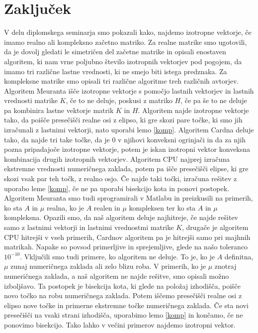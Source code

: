 \documentclass[12pt,a4paper]{amsart}
\theoremstyle{definition}
\theoremstyle{plain}
\begin{document}
\section{Zaključek}
V delu diplomskega seminarja smo pokazali kako, najdemo izotropne vektorje, če imamo realno ali kompleksno začetno matriko. 
Za realne matrike smo ugotovili, da je dovolj gledati le simetričen del začetne matrike in opisali enostaven algoritem, ki nam vrne poljubno število izotropnih vektorjev pod pogojem, da imamo tri različne lastne vrednosti, ki ne smejo biti istega predznaka. 
Za kompleksne matrike smo opisali tri različne algoritme treh različnih avtorjev. 
Algoritem Meuranta išče izotropne vektorje s pomočjo lastnih vektorjev in lastnih vrednosti matrike $K$, če to ne deluje, poskusi z matriko $H$, če pa še to ne deluje pa kombinira lastne vektorje matrik $K$ in $H$. 
Algoritem najde izotropne vektorje tako, da poišče presečišči realne osi z elipso, ki gre skozi pare točke, ki smo jih izračunali z lastnimi vektorji, nato uporabi lemo \ref{komp}. 
Algoritem Cardna deluje tako, da najde tri take točke, da je 0 v njihovi konveksni ogrinjači in da za njih pozna pripadajoče izotropne vektorje, potem je iskan izotropni vektor konveksna kombinacija drugih izotropnih vektorjev. 
Algoritem CPU najprej izračuna ekstremne vrednosti numeričnega zaklada, potem pa išče presečišči elipse, ki gre skozi vsak par teh točk, z realno osjo. 
Če najde taki točki, izračuna rešitev z uporabo leme \ref{komp}, če ne pa uporabi bisekcijo kota in ponovi postopek. 
Algoritem Meuranta smo tudi sprogramirali v Matlabu in preizkusili na primerih, ko sta $A$ in $\mu$ realna, ko je $A$ realen in $\mu$ kompleksen ter ko sta $A$ in $\mu$ kompleksna. 
Opazili smo, da naš algoritem deluje najhitreje, če najde rešitev samo z lastnimi vektorji in lastnimi vrednostmi matrike $K$, drugače je algoritem CPU hitrejši v vseh primerih, Cardnov algoritem pa je hitrejši samo pri majhnih matrikah. 
Napake so povsod primerljive in sprejemljive, glede na našo toleranco $10^{-10}$. 
Vključili smo tudi primere, ko algoritem ne deluje. 
To je, ko je $A$ definitna, $\mu$ zunaj numeričnega zaklada ali zelo blizu roba. 
V primerih, ko je $\mu$ znotraj numeričnega zaklada, a naš algoritem ne najde rešitve, smo opisali možno izboljšavo. 
Ta postopek je bisekcija kota, ki glede na položaj izhodišča, poišče novo  točko na robu numeričnega zaklada. 
Potem iščemo presečišči realne osi z elipso nove točke in primerne ekstremne točke numeričnega zaklada. 
Če sta novi presečišči na vsaki strani izhodišča, uporabimo lemo \ref{komp} in končamo, če ne ponovimo bisekcijo. 
Tako lahko v večini primerov  najdemo izotropni vektor.
\end{document}
